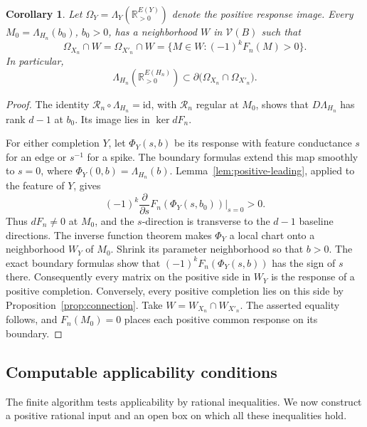 \documentclass[11pt]{article}
\newtheorem{corollary}[theorem]{Corollary}
\theoremstyle{definition}
\newcommand{\Vresp}{\mathcal V}
\newcommand{\RR}{\mathbb R}
\newcommand{\rec}{\mathcal R}
\begin{document}
\begin{corollary}
\label{cor:positive-boundary}
Let \(\Omega_Y=\Lambda_Y(\RR_{>0}^{E(Y)})\) denote the positive
response image. Every \(M_0=\Lambda_{H_n}(b_0)\), \(b_0>0\),
has a neighborhood \(W\) in \(\Vresp(B)\) such that
\[
 \Omega_{X_n}\cap W
 =\Omega_{X'_n}\cap W
 =\{M\in W:(-1)^kF_n(M)>0\}.
\]
In particular,
\[
 \Lambda_{H_n}(\RR_{>0}^{E(H_n)})
 \subset
 \partial\bigl(\Omega_{X_n}\cap\Omega_{X'_n}\bigr).
\]
\end{corollary}
\begin{proof}
The identity \(\rec_n\circ\Lambda_{H_n}=\mathrm{id}\), with
\(\rec_n\) regular at \(M_0\), shows that
\(D\Lambda_{H_n}\) has rank \(d-1\) at \(b_0\).
Its image lies in \(\ker dF_n\).

For either completion \(Y\), let \(\Phi_Y(s,b)\) be its response
with feature conductance \(s\) for an edge or \(s^{-1}\) for a spike.
The boundary formulas extend this map smoothly to \(s=0\), where
\(\Phi_Y(0,b)=\Lambda_{H_n}(b)\).
Lemma~\ref{lem:positive-leading}, applied to the feature of \(Y\),
gives
\[
 (-1)^k\frac{\partial}{\partial s}
 F_n(\Phi_Y(s,b_0))\bigg|_{s=0}>0.
\]
Thus \(dF_n\ne0\) at \(M_0\), and the \(s\)-direction is transverse
to the \(d-1\) baseline directions. The inverse function theorem
makes \(\Phi_Y\) a local chart onto a neighborhood \(W_Y\) of \(M_0\).
Shrink its parameter neighborhood so that \(b>0\).
The exact boundary formulas show that
\((-1)^kF_n(\Phi_Y(s,b))\) has the sign of \(s\) there.
Consequently every matrix on the positive side in \(W_Y\) is the
response of a positive completion.
Conversely, every positive completion lies on this side by
Proposition~\ref{prop:connection}.
Take \(W=W_{X_n}\cap W_{X'_n}\). The asserted equality follows,
and \(F_n(M_0)=0\) places each positive common response on its boundary.
\end{proof}

\subsection{Computable applicability conditions}

The finite algorithm tests applicability by rational inequalities.
We now construct a positive rational input and an open box on which
all these inequalities hold.
\end{document}
